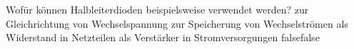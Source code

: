     {Wofür können Halbleiterdioden beispielsweise verwendet werden?}
    {zur Gleichrichtung von Wechselspannung}
    {zur Speicherung von Wechselströmen}
    {als Widerstand in Netzteilen}
    {als Verstärker in Stromversorgungen}
    {false}{false}